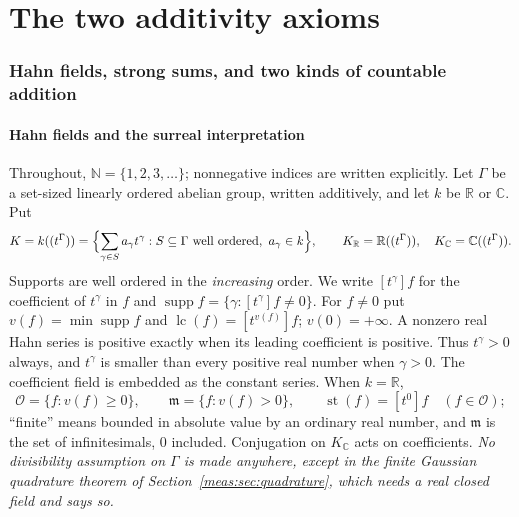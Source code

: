 \documentclass[11pt]{article}
\numberwithin{equation}{section}
\theoremstyle{definition}
\theoremstyle{remark}
\newcommand{\R}{\mathbb R}
\newcommand{\C}{\mathbb C}
\newcommand{\N}{\mathbb N}
\newcommand{\KR}{K_{\R}}
\newcommand{\KC}{K_{\C}}
\newcommand{\supp}{\operatorname{supp}}
\newcommand{\st}{\operatorname{st}}
\newcommand{\lc}{\operatorname{lc}}
\newcommand{\coef}[2]{[t^{#1}]#2}
\begin{document}
\part{The two additivity axioms}\label{meas:part:axioms}

\section{Hahn fields, strong sums, and two kinds of countable addition}
\label{meas:sec:axioms}

\subsection{Hahn fields and the surreal interpretation}\label{meas:sub:hahn}

Throughout, $\N=\{1,2,3,\ldots\}$; nonnegative indices are written explicitly.
Let $\Gamma$ be a set-sized linearly ordered abelian group, written additively,
and let $k$ be $\R$ or $\C$. Put
\[
 K=k((t^\Gamma))
 =\Bigl\{\sum_{\gamma\in S}a_\gamma t^\gamma:
       S\subseteq\Gamma\text{ well ordered},\ a_\gamma\in k\Bigr\},
 \qquad \KR=\R((t^\Gamma)),\quad \KC=\C((t^\Gamma)).
\]
Supports are well ordered in the \emph{increasing} order. We write
$\coef{\gamma}{f}$ for the coefficient of $t^\gamma$ in $f$ and
$\supp f=\{\gamma:\coef{\gamma}{f}\ne0\}$. For $f\ne0$ put
$v(f)=\min\supp f$ and $\lc(f)=\coef{v(f)}{f}$; $v(0)=+\infty$. A nonzero real
Hahn series is positive exactly when its leading coefficient is positive. Thus
$t^\gamma>0$ always, and $t^\gamma$ is smaller than every positive real number
when $\gamma>0$. The coefficient field is embedded as the constant series.
When $k=\R$,
\[
 \mathcal O=\{f:v(f)\ge0\},\qquad
 \mathfrak m=\{f:v(f)>0\},\qquad
 \st(f)=\coef{0}{f}\quad(f\in\mathcal O);
\]
``finite'' means bounded in absolute value by an ordinary real number, and
$\mathfrak m$ is the set of infinitesimals, $0$ included. Conjugation on $\KC$
acts on coefficients. \emph{No divisibility assumption on $\Gamma$ is made
anywhere, except in the finite Gaussian quadrature theorem of
Section~\ref{meas:sec:quadrature}, which needs a real closed field and says so.}
\end{document}
